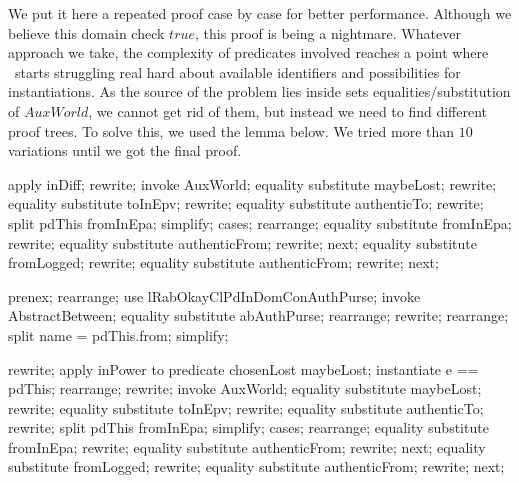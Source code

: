 We put it here a repeated proof case by case for better performance.
Although we believe this domain check $true$, this proof is being a
nightmare. Whatever approach we take, the complexity of predicates
involved reaches a point where \zeves\ starts struggling real hard
about available identifiers and possibilities for instantiations. As
the source of the problem lies inside sets equalities/substitution
of $AuxWorld$, we cannot get rid of them, but instead we need to
find different proof trees. To solve this, we used the lemma below.
We tried more than $10$ variations until we got the final proof.
\begin{LPScript}\begin{zproof}[lRabOkayClPdInDomConAuthPurse]
    apply inDiff;
    rewrite;
    invoke AuxWorld;
    equality substitute maybeLost;
    rewrite;
    equality substitute toInEpv;
    rewrite;
    equality substitute authenticTo;
    rewrite;
    split pdThis \in fromInEpa;
    simplify;
    cases;
    rearrange;
    equality substitute fromInEpa;
    rewrite;
    equality substitute authenticFrom;
    rewrite;
    next;
    equality substitute fromLogged;
    rewrite;
    equality substitute authenticFrom;
    rewrite;
    next;
\end{zproof}\end{LPScript}
%
\begin{LDCheck}\begin{zproof}
    prenex;
    rearrange;
    use lRabOkayClPdInDomConAuthPurse;
    invoke AbstractBetween;
    equality substitute \dom abAuthPurse;
    rearrange;
    rewrite;
    rearrange;
    split name = pdThis.from;
    simplify;
\end{zproof}\end{LDCheck}

\begin{LPScript}\begin{zproof}[lRabWillBeLostClPdInDomConAuthPurse]
    rewrite;
    apply inPower to predicate chosenLost \in \power maybeLost;
    instantiate e == pdThis;
    rearrange;
    rewrite;
    invoke AuxWorld;
    equality substitute maybeLost;
    rewrite;
    equality substitute toInEpv;
    rewrite;
    equality substitute authenticTo;
    rewrite;
    split pdThis \in fromInEpa;
    simplify;
    cases;
    rearrange;
    equality substitute fromInEpa;
    rewrite;
    equality substitute authenticFrom;
    rewrite;
    next;
    equality substitute fromLogged;
    rewrite;
    equality substitute authenticFrom;
    rewrite;
    next;
\end{zproof}\end{LPScript}

